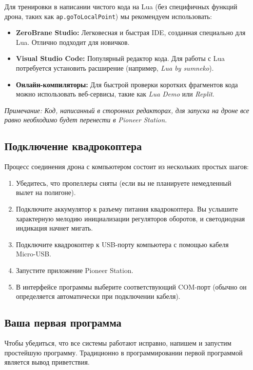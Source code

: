 Для тренировки в написании чистого кода на Lua (без специфичных функций дрона, таких как \texttt{ap.goToLocalPoint}) мы рекомендуем использовать:

\begin{itemize}
    \item \textbf{ZeroBrane Studio:} Легковесная и быстрая IDE, созданная специально для Lua. Отлично подходит для новичков.
    \item \textbf{Visual Studio Code:} Популярный редактор кода. Для работы с Lua потребуется установить расширение (например, \textit{Lua by sumneko}).
    \item \textbf{Онлайн-компиляторы:} Для быстрой проверки коротких фрагментов кода можно использовать веб-сервисы, такие как \textit{Lua Demo} или \textit{Replit}.
\end{itemize}

\textit{Примечание: Код, написанный в сторонних редакторах, для запуска на дроне все равно необходимо будет перенести в Pioneer Station.}

\subsection{Подключение квадрокоптера}

Процесс соединения дрона с компьютером состоит из нескольких простых шагов:

\begin{enumerate}
    \item Убедитесь, что пропеллеры сняты (если вы не планируете немедленный вылет на полигоне).
    \item Подключите аккумулятор к разъему питания квадрокоптера. Вы услышите характерную мелодию инициализации регуляторов оборотов, и светодиодная индикация начнет мигать.
    \item Подключите квадрокоптер к USB-порту компьютера с помощью кабеля Micro-USB.
    \item Запустите приложение Pioneer Station.
    \item В интерфейсе программы выберите соответствующий COM-порт (обычно он определяется автоматически при подключении кабеля).
\end{enumerate}

\subsection{Ваша первая программа}

Чтобы убедиться, что все системы работают исправно, напишем и запустим простейшую программу. Традиционно в программировании первой программой является вывод приветствия.


